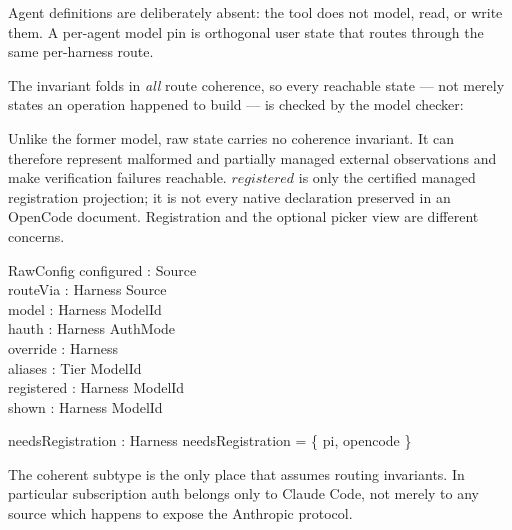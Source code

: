 \documentclass{article}
\begin{document}
Agent definitions are deliberately absent: the tool does not model, read, or
write them. A per-agent model pin is orthogonal user state that routes through
the same per-harness route.

The invariant folds in \emph{all} route coherence, so every reachable state
--- not merely states an operation happened to build --- is checked by the model
checker:

Unlike the former model, raw state carries no coherence invariant.  It can
therefore represent malformed and partially managed external observations and
make verification failures reachable.  $registered$ is only the certified
managed registration projection; it is not every native declaration preserved
in an OpenCode document.  Registration and the optional picker view are
different concerns.

\begin{schema}{RawConfig}
	configured : \power Source \\
	routeVia : Harness \pfun Source \\
	model : Harness \pfun ModelId \\
	hauth : Harness \pfun AuthMode \\
	override : \power Harness \\
	aliases : Tier \pfun ModelId \\
	registered : Harness \pfun \power ModelId \\
	shown : Harness \pfun \power ModelId
\end{schema}

\begin{axdef}
	needsRegistration : \power Harness
	\where
	needsRegistration = \{ pi, opencode \}
\end{axdef}

The coherent subtype is the only place that assumes routing invariants.  In
particular subscription auth belongs only to Claude Code, not merely to any
source which happens to expose the Anthropic protocol.
\end{document}
